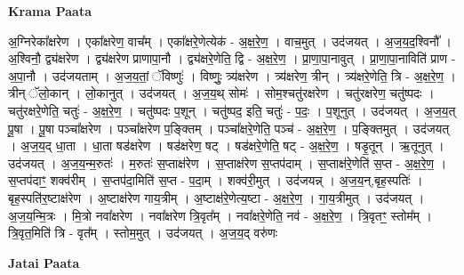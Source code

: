 \documentclass[17pt]{extarticle}
\begin{document}
\textbf{Krama Paata} \newline

अ॒ग्निरेका᳚क्षरेण । एका᳚क्षरेण॒ वाच᳚म् । एका᳚क्षरे॒णेत्येक॑ - अ॒क्ष॒रे॒ण॒ । वाच॒मुत् । उद॑जयत् । अ॒ज॒य॒द॒श्विनौ᳚ । अ॒श्विनौ॒ द्व्य॑क्षरेण । द्व्य॑क्षरेण प्राणापा॒नौ । द्व्य॑क्षरे॒णेति॒ द्वि - अ॒क्ष॒रे॒ण॒ । प्रा॒णा॒पा॒नावुत् । प्रा॒णा॒पा॒नाविति॑ प्राण - अ॒पा॒नौ । उद॑जयताम् । अ॒ज॒य॒तां॒ ॅविष्णुः॑ । विष्णुः॒ त्र्य॑क्षरेण । त्र्य॑क्षरेण॒ त्रीन् । त्र्य॑क्षरे॒णेति॒ त्रि - अ॒क्ष॒रे॒ण॒ । त्रीन् ॅलो॒कान् । लो॒कानुत् । उद॑जयत् । अ॒ज॒य॒थ् सोमः॑ । सोम॒श्चतु॑रक्षरेण । चतु॑रक्षरेण॒ चतु॑ष्पदः । चतु॑रक्षरे॒णेति॒ चतुः॑ - अ॒क्ष॒रे॒ण॒ । चतु॑ष्पदः प॒शून् । चतु॑ष्पद॒ इति॒ चतुः॑ - प॒दः॒ । प॒शूनुत् । उद॑जयत् । अ॒ज॒य॒त् पू॒षा । पू॒षा पञ्चा᳚क्षरेण । पञ्चा᳚क्षरेण प॒ङ्क्तिम् । पञ्चा᳚क्षरे॒णेति॒ पञ्च॑ - अ॒क्ष॒रे॒ण॒ । प॒ङ्क्तिमुत् । उद॑जयत् । अ॒ज॒य॒द् धा॒ता । धा॒ता षड॑क्षरेण । षड॑क्षरेण॒ षट् । षड॑क्षरे॒णेति॒ षट् - अ॒क्ष॒रे॒ण॒ । षडृ॒तून् । ऋ॒तूनुत् । उद॑जयत् । अ॒ज॒य॒न्म॒रुतः॑ । म॒रुतः॑ स॒प्ताक्ष॑रेण । स॒प्ताक्ष॑रेण स॒प्तप॑दाम् । स॒प्ताक्ष॑रे॒णेति॑ स॒प्त - अ॒क्ष॒रे॒ण॒ । स॒प्तप॑दाꣳ॒॒ शक्व॑रीम् । स॒प्तप॑दा॒मिति॑ स॒प्त - प॒दा॒म् । शक्व॑री॒मुत् । उद॑जयन्न् । अ॒ज॒य॒न्,बृह॒स्पतिः॑ । बृह॒स्पति॑र॒ष्टाक्ष॑रेण । अ॒ष्टाक्ष॑रेण गाय॒त्रीम् । अ॒ष्टाक्ष॑रे॒णेत्य॒ष्टा - अ॒क्ष॒रे॒ण॒ । गा॒य॒त्रीमुत् । उद॑जयत् । अ॒ज॒य॒न्मि॒त्रः । मि॒त्रो नवा᳚क्षरेण । नवा᳚क्षरेण त्रि॒वृत᳚म् । नवा᳚क्षरे॒णेति॒ नव॑ - अ॒क्ष॒रे॒ण॒ । त्रि॒वृतꣳ॒॒ स्तोम᳚म् । त्रि॒वृत॒मिति॑ त्रि - वृत᳚म् । स्तोम॒मुत् । उद॑जयत् । अ॒ज॒य॒द् वरु॑णः \newline

\textbf{Jatai Paata} \newline
\end{document}
